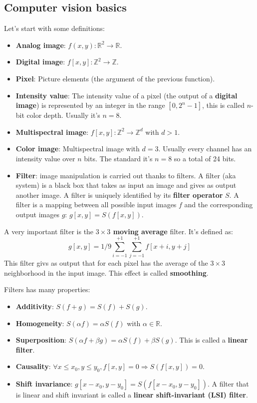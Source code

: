 \subsection{Computer vision basics}
\label{sec:computer_vision}

Let's start with some definitions:
\begin{itemize}
    \item \textbf{Analog image}: $f(x,y):\mathbb{R}^2 \rightarrow \mathbb{R}$.
    \item \textbf{Digital image}: $f[x,y]:\mathbb{Z}^2 \rightarrow \mathbb{Z}$.
    \item \textbf{Pixel}: Picture elements (the argument of the previous function).
    \item \textbf{Intensity value}: The intensity value of a pixel 
    (the output of a \textbf{digital image})
    is represented by an integer in the range $[0,2^n-1]$, this is called
    $n$-bit color depth. Usually it's $n=8$.
    \item \textbf{Multispectral image}: $f[x,y]: \mathbb{Z}^2 \rightarrow \mathbb{Z}^d$ with $d>1$.
    \item \textbf{Color image}: Multispectral image with $d=3$. Usually every channel
    has an intensity value over $n$ bits. The standard it's $n=8$ so a total of 24 bits.
    \item \textbf{Filter}: image manipulation is carried out thanks to filters. A filter
    (aka system) is a black box that takes as input an image and gives as output another image.
    A filter is uniquely identified by its \textbf{filter operator} $S$. A filter is a mapping
    between all possible input images $f$ and the corresponding output images $g$:
    $g[x,y]=S(f[x,y])$.
\end{itemize}

A very important filter is the \textbf{$3\times 3$ moving average} filter. It's defined as:
\[
    g[x,y]=1/9\sum_{i=-1}^{+1}\sum_{j=-1}^{+1}f[x+i,y+j]
\]
This filter givs as output that for each pixel has the average of the $3\times 3$ neighborhood
in the input image. This effect is called \textbf{smoothing}.

Filters has many properties:
\begin{itemize}
    \item \textbf{Additivity}: $S(f+g) = S(f) + S(g)$.
    \item \textbf{Homogeneity}: $S(\alpha f) = \alpha S(f)$ with $\alpha\in\mathbb{R}$.
    \item \textbf{Superposition}: $S(\alpha f + \beta g) = \alpha S(f) + \beta S(g)$. This
    is called a \textbf{linear filter}.
    \item \textbf{Causality}: $\forall x\le x_0,y\le y_0, f[x,y]=0 \Rightarrow S(f[x,y])=0$.
    \item \textbf{Shift invariance}: $g[x-x_0,y-y_0]=S(f[x-x_0,y-y_0])$. A filter
    that is linear and shift invariant is called a \textbf{linear shift-invariant (LSI) filter}.
\end{itemize}

